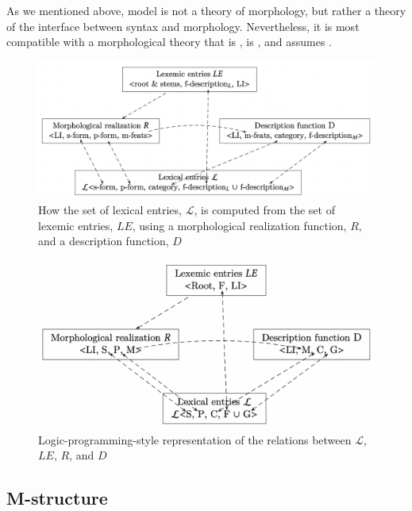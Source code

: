 \documentclass[output=paper,hidelinks]{langscibook}
\begin{document}
As we mentioned above,  model is not a theory of
morphology, but rather a theory of the interface between syntax and
morphology. Nevertheless, it is most compatible with a morphological
theory that is , is , and 
assumes .  

%
\begin{figure}[htb]
  \centering
  \includegraphics[scale=.325]{figures/Morphology/Dal15-15.png}
  \caption{How the set of lexical entries, $\mathcal{L}$, is computed
    from the set of lexemic entries, $LE$, using a morphological
    realization function, $R$, and a description function, $D$
    \citep[70~(15); used with permission]{dalrymple15}}
  \label{fig:dalrymple15-15}
\end{figure}
 
\begin{figure}[htb]
  \centering
  \includegraphics[scale=.325]{figures/Morphology/Dal15-15-alt.png}
  \caption{Logic-programming-style representation of the relations
    between $\mathcal{L}$, $LE$, $R$, and $D$}
  \label{fig:dalrymple15-15-logic}
\end{figure}

\subsection{M-structure}
\label{sec:Morph:m-structure}
\end{document}
